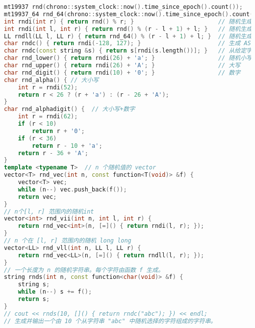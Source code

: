 \begin{lstlisting}[language=C++]
mt19937 rnd(chrono::system_clock::now().time_since_epoch().count());
mt19937_64 rnd_64(chrono::system_clock::now().time_since_epoch().count());
int rndi(int r) { return rnd() % r; }                        // 随机生成0-(r-1)
int rndi(int l, int r) { return rnd() % (r - l + 1) + l; }   // 随机生成l-r
LL rndll(LL l, LL r) { return rnd_64() % (r - l + 1) + l; }  // 随机生成0-(r-1)
char rndc() { return rndi(-128, 127); }                      // 生成 ASCII 码在 [-128, 127] 范围内的随机字符
char rndc(const string &s) { return s[rndi(s.length())]; }   // 从给定字符串 s 中随机选择一个字符
char rnd_lower() { return rndi(26) + 'a'; }                  // 随机小写字母
char rnd_upper() { return rndi(26) + 'A'; }                  // 大写
char rnd_digit() { return rndi(10) + '0'; }                  // 数字
char rnd_alpha() { // 大小写
    int r = rndi(52);
    return r < 26 ? (r + 'a') : (r - 26 + 'A');
}                        
char rnd_alphadigit() {  // 大小写+数字
    int r = rndi(62);
    if (r < 10)
        return r + '0';
    if (r < 36)
        return r - 10 + 'a';
    return r - 36 + 'A';
}
template <typename T>  // n 个随机值的 vector
vector<T> rnd_vec(int n, const function<T(void)> &f) {
    vector<T> vec;
    while (n--) vec.push_back(f());
    return vec;
}
// n个[l, r] 范围内的随机int
vector<int> rnd_vii(int n, int l, int r) {
    return rnd_vec<int>(n, [=]() { return rndi(l, r); });
}
// n 个在 [l, r] 范围内的随机 long long
vector<LL> rnd_vll(int n, LL l, LL r) {
    return rnd_vec<LL>(n, [=]() { return rndll(l, r); });
}
// 一个长度为 n 的随机字符串。每个字符由函数 f 生成。
string rnds(int n, const function<char(void)> &f) {
    string s;
    while (n--) s += f();
    return s;
}
// cout << rnds(10, []() { return rndc("abc"); }) << endl;
// 生成并输出一个由 10 个从字符串 "abc" 中随机选择的字符组成的字符串。
\end{lstlisting}
